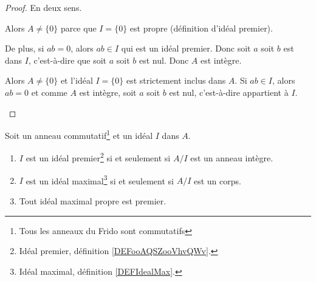 \begin{proof}
	En deux sens.
	\begin{subproof}
		Alors \( A\neq \{ 0 \}\) parce que \( I=\{ 0 \}\) est propre (définition d'idéal premier).

		De plus, si \( ab=0\), alors \( ab\in I\) qui est un idéal premier. Donc soit \( a\) soit \( b\) est dans \( I\), c'est-à-dire que soit \( a\) soit \( b\) est nul. Donc \( A\) est intègre.

		Alors \( A\neq \{ 0 \}\) et l'idéal \( I=\{ 0 \}\) est strictement inclus dans \( A\). Si \( ab\in I\), alors \( ab=0\) et comme \( A\) est intègre, soit \( a\) soit \( b\) est nul, c'est-à-dire appartient à \( I\).
	\end{subproof}
\end{proof}

\begin{proposition}      \label{PROPooRUQKooIfbnQX}
	Soit un anneau commutatif\footnote{Tous les anneaux du Frido sont commutatifs} et un idéal \( I\) dans \( A\).
	\begin{enumerate}
		\item       \label{ITEMooUGBTooOGrnWl}
		      \( I\) est un idéal premier\footnote{Idéal premier, définition \ref{DEFooAQSZooVhvQWv}.} si et seulement si \( A/I\) est un anneau intègre.
		\item   \label{ITEMooGLXSooUjINqR}
		      \( I\) est un idéal maximal\footnote{Idéal maximal, définition \ref{DEFIdealMax}.} si et seulement si \( A/I\) est un corps.
		\item       \label{ITEMooTFFQooOUajFw}
		      Tout idéal maximal propre est premier.
	\end{enumerate}
\end{proposition}

